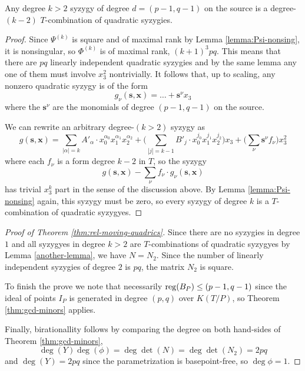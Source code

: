 \documentclass[fleqn,reqno]{amsart}
\begin{document}
\begin{lemma}
\label{another-lemma}
Any degree $k>2$ syzygy of degree $d=(p-1,q-1)$ on the source is a degree-$(k-2)$
$T$-combination of quadratic syzygies.
\end{lemma}

\begin{proof}
Since $\Psi^{(k)}$ is square and of maximal rank by Lemma \ref{lemma:Psi-nonsing},
it is nonsingular, so $\Phi^{(k)}$ is of maximal rank, $(k+1)^3pq$.
This means that there are $pq$ linearly independent quadratic syzygies
and by the same lemma any one of them must involve $x_3^2$ nontrivially.
It follows that, up to scaling, any nonzero quadratic syzygy is of the form
\[
	g_\nu(\mathbf s,\mathbf x)=\ldots+{\mathbf{s}}^\nu x_3
\]
where the $\mathbf{s}^\nu$ are the monomials of degree $(p-1,q-1)$ on the source.

We can rewrite an arbitrary degree-$(k>2)$ syzygy as
\[
	g(\mathbf s, \mathbf x)=\sum_{|\alpha|=k} A'_\alpha\cdot
	x_0^{\alpha_0}x_1^{\alpha_1}x_2^{\alpha_2}+
	\big(\sum_{|j|=k-1} B'_{j}\cdot
	x_0^{j_0}x_1^{j_1}x_2^{j_2}\big)x_3+
	\big(\sum_\nu \mathbf{s}^\nu f_\nu\big)x_3^2
\]
where each $f_\nu$ is a form degree $k-2$ in $T$, so the syzygy
\[
	g(\mathbf s, \mathbf x)-\sum_\nu f_\nu\cdot g_\nu(\mathbf s, \mathbf x)
\]
has trivial $x_3^k$ part in the sense of the discussion above.
By Lemma \ref{lemma:Psi-nonsing} again, this syzygy must be zero,
so every syzygy of degree $k$ is a $T$-combination of quadratic syzygyes.
\end{proof}

\begin{proof}[\titlestyle Proof of Theorem \ref{thm:rel-moving-quadrics}]
	Since there are no syzygies in degree $1$ and all syzygyes in degree $k>2$ are $T$-combinations
	of quadratic syzygyes by Lemma \ref{another-lemma},
	we have $N=N_2$. Since the number of linearly independent syzygies
	of degree $2$ is $pq$, the matrix $N_2$ is square.
	
	To finish the prove we note that necessarily $\operatorname{reg}(B_P)\leq(p-1,q-1)$ since the ideal of points
	$I_P$ is generated in degree $(p,q)$ over $K(T/P)$,
	so Theorem \ref{thm:gcd-minors} applies.
	
	Finally, birationallity follows by comparing the degree on both hand-sides of Theorem \ref{thm:gcd-minors},
	\[
		\deg(Y)\deg(\phi)=\deg\det (N)=\deg\det(N_2)=2pq
	\]
	and $\deg(Y)=2pq$ since the parametrization is basepoint-free, so $\deg\phi=1$.
\end{proof}
\end{document}
